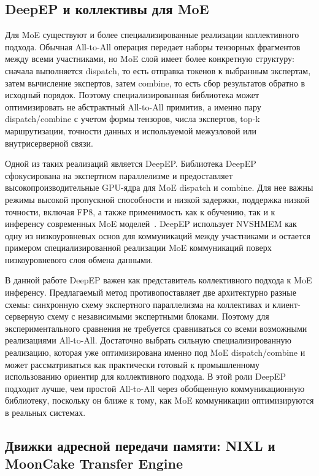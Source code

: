 \subsection{DeepEP и коллективы для MoE}

Для MoE существуют и более специализированные реализации коллективного подхода. Обычная All-to-All операция передает наборы тензорных фрагментов между всеми участниками, но MoE слой имеет более конкретную структуру: сначала выполняется dispatch, то есть отправка токенов к выбранным экспертам, затем вычисление экспертов, затем combine, то есть сбор результатов обратно в исходный порядок. Поэтому специализированная библиотека может оптимизировать не абстрактный All-to-All примитив, а именно пару dispatch/combine с учетом формы тензоров, числа экспертов, top-k маршрутизации, точности данных и используемой межузловой или внутрисерверной связи.

Одной из таких реализаций является DeepEP. Библиотека DeepEP сфокусирована на экспертном параллелизме и предоставляет высокопроизводительные GPU-ядра для MoE dispatch и combine. Для нее важны режимы высокой пропускной способности и низкой задержки, поддержка низкой точности, включая FP8, а также применимость как к обучению, так и к инференсу современных MoE моделей~\cite{deepseekDeepEP}. DeepEP использует NVSHMEM как одну из низкоуровневых основ для коммуникаций между участниками и остается примером специализированной реализации MoE коммуникаций поверх низкоуровневого слоя обмена данными.

В данной работе DeepEP важен как представитель коллективного подхода к MoE инференсу. Предлагаемый метод противопоставляет две архитектурно разные схемы: синхронную схему экспертного параллелизма на коллективах и клиент-серверную схему с независимыми экспертными блоками. Поэтому для экспериментального сравнения не требуется сравниваться со всеми возможными реализациями All-to-All. Достаточно выбрать сильную специализированную реализацию, которая уже оптимизирована именно под MoE dispatch/combine и может рассматриваться как практически готовый к промышленному использованию ориентир для коллективного подхода. В этой роли DeepEP подходит лучше, чем простой All-to-All через обобщенную коммуникационную библиотеку, поскольку он ближе к тому, как MoE коммуникации оптимизируются в реальных системах.

\subsection{Движки адресной передачи памяти: NIXL и MoonCake Transfer Engine}

